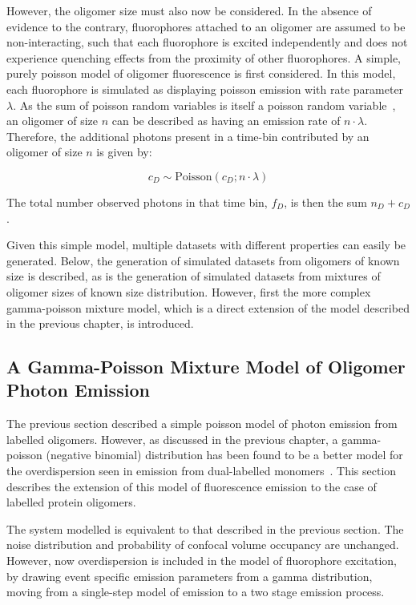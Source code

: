 However, the oligomer size must also now be considered. In the absence of evidence to the contrary, fluorophores attached to an oligomer are assumed to be non-interacting, such that each fluorophore is excited independently and does not experience quenching effects from the proximity of other fluorophores. A simple, purely poisson model of oligomer fluorescence is first considered. In this model, each fluorophore is simulated as displaying poisson emission with rate parameter $\lambda$. As the sum of poisson random variables is itself a poisson random variable~\cite{Lehmann1986}, an oligomer of size $n$ can be described as having an emission rate of $n \cdot \lambda$. Therefore, the additional photons present in a time-bin contributed by an oligomer of size $n$ is given by:

\begin{equation}
c_D \sim \text{Poisson}(c_D; n \cdot \lambda)
\label{eq:n_photons}
\end{equation} 

The total number observed photons in that time bin, $f_D$, is then the sum $n_D + c_D$.

Given this simple model, multiple datasets with different properties can easily be generated. Below, the generation of simulated datasets from oligomers of known size is described, as is the generation of simulated datasets from mixtures of oligomer sizes of known size distribution. However, first the more complex gamma-poisson mixture model, which is a direct extension of the model described in the previous chapter, is introduced.

\subsection{A Gamma-Poisson Mixture Model of Oligomer Photon Emission}
The previous section described a simple poisson model of photon emission from labelled oligomers. However, as discussed in the previous chapter, a gamma-poisson (negative binomial) distribution has been found to be a better model for the overdispersion seen in emission from dual-labelled monomers~\cite{murphy14}. This section describes the extension of this model of fluorescence emission to the case of labelled protein oligomers.

The system modelled is equivalent to that described in the previous section. The noise distribution and probability of confocal volume occupancy are unchanged. However, now overdispersion is included in the model of fluorophore excitation, by drawing event specific emission parameters from a gamma distribution, moving from a single-step model of emission to a two stage emission process. 

